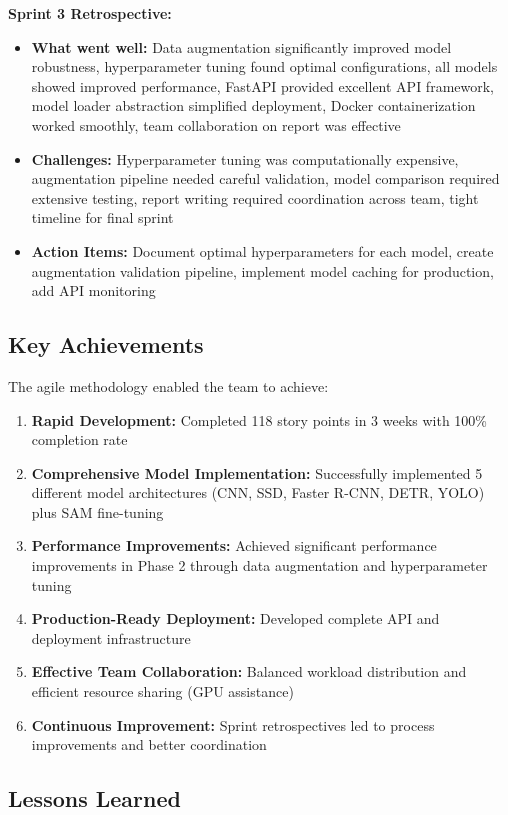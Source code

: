 \documentclass[12pt,a4paper]{article}
\begin{document}
\textbf{Sprint 3 Retrospective:}
\begin{itemize}
    \item \textbf{What went well:} Data augmentation significantly improved model robustness, hyperparameter tuning found optimal configurations, all models showed improved performance, FastAPI provided excellent API framework, model loader abstraction simplified deployment, Docker containerization worked smoothly, team collaboration on report was effective
    \item \textbf{Challenges:} Hyperparameter tuning was computationally expensive, augmentation pipeline needed careful validation, model comparison required extensive testing, report writing required coordination across team, tight timeline for final sprint
    \item \textbf{Action Items:} Document optimal hyperparameters for each model, create augmentation validation pipeline, implement model caching for production, add API monitoring
\end{itemize}

\subsection{Key Achievements}

The agile methodology enabled the team to achieve:

\begin{enumerate}
    \item \textbf{Rapid Development:} Completed 118 story points in 3 weeks with 100\% completion rate
    \item \textbf{Comprehensive Model Implementation:} Successfully implemented 5 different model architectures (CNN, SSD, Faster R-CNN, DETR, YOLO) plus SAM fine-tuning
    \item \textbf{Performance Improvements:} Achieved significant performance improvements in Phase 2 through data augmentation and hyperparameter tuning
    \item \textbf{Production-Ready Deployment:} Developed complete API and deployment infrastructure
    \item \textbf{Effective Team Collaboration:} Balanced workload distribution and efficient resource sharing (GPU assistance)
    \item \textbf{Continuous Improvement:} Sprint retrospectives led to process improvements and better coordination
\end{enumerate}

\subsection{Lessons Learned}
\end{document}

